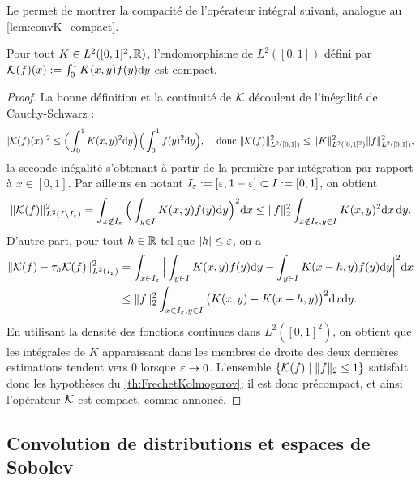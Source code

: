 Le  permet de montrer la compacité de l'opérateur intégral suivant, analogue au \cref{lem:convK_compact}.

\begin{exemple}
\label{ex:operCompactL2}
%
Pour tout $K \in L^2([0,1]^2,\mathbb{R})$, l'endomorphisme de $L^2([0,1])$ défini par $\mathcal{K}(f)(x) := \int_0^1 K(x,y) f(y) \mathrm{d} y$ est compact.
\end{exemple}

\begin{proof}
La bonne définition et la continuité de $\mathcal{K}$ découlent de l'inégalité de Cauchy-Schwarz : 
	\begin{align*}
		|\mathcal{K}(f)(x)|^2 &\leq \Big(\int_0^1 K(x,y)^2 \mathrm{d} y\Big) \Big( \int_0^1 f(y)^2 \mathrm{d} y\Big), &
		\text{ donc } 
		\| \mathcal{K}(f)\|^2_{L^2([0,1])} \leq \|K\|_{L^2([0,1]^2)}^2 \|f\|^2_{L^2([0,1])}, 
	\end{align*}
	la seconde inégalité s'obtenant à partir de la première par intégration par rapport à $x \in [0,1]$. 
	Par ailleurs en notant $I_\varepsilon := [\varepsilon,1-\varepsilon] \subset I := [0,1]$, on obtient %
	\begin{equation*}
		\|\mathcal{K}(f)\|_{L^2(I \setminus I_\varepsilon)}^2 = 
		\int_{x \notin I_\varepsilon} \Big(\int_{y\in I} K(x,y) f(y) \mathrm{d} y\Big)^2 \mathrm{d} x \leq 
		\|f\|^2_2 \int_{x \notin I_\varepsilon, y \in I} K(x,y)^2 \mathrm{d} x \, \mathrm{d} y.
	\end{equation*}
	D'autre part, pour tout $h\in \mathbb{R}$ tel que $|h| \leq \varepsilon$, on a 
	\begin{align*}
		\|\mathcal{K}(f)-\tau_h \mathcal{K}(f) \|_{L^2(I_\varepsilon)}^2 &= 
		\int_{x \in I_\varepsilon} \Big| \int_{y\in I} K(x,y) f(y) \mathrm{d} y - \int_{y\in I} K(x-h,y) f(y) \mathrm{d} y \Big|^2 \mathrm{d} x \\
		&\leq \|f\|^2_2 \int_{x \in I_\varepsilon, y \in I} \big(K(x,y)-K(x-h,y)\big)^2 \mathrm{d} x \mathrm{d} y.
	\end{align*}
	En utilisant la densité des fonctions continues dans $L^2([0,1]^2)$, on obtient que les intégrales de $K$ apparaissant dans les membres de droite des deux dernières estimations tendent vers $0$ lorsque $\varepsilon\to 0$. L'ensemble $\{\mathcal{K}(f)\mid \|f\|_2 \leq 1\}$ satisfait donc les hypothèses du \cref{th:FrechetKolmogorov}; il est donc précompact, et ainsi l'opérateur $\mathcal{K}$ est compact, comme annoncé.
\end{proof}


\subsection{Convolution de distributions et espaces de Sobolev}
\label{subsec:convolSobolev}


